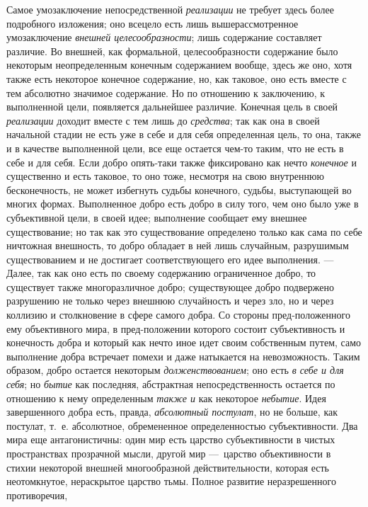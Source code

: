 \documentclass[twoside]{article}
\begin{document}
Самое умозаключение непосредственной
{\em реализации} не
требует здесь более подробного изложения; оно всецело есть лишь
вышерассмотренное умозаключение
{\em внешней целесообразности};
лишь содержание составляет различие. Во внешней, как
формальной, целесообразности содержание было некоторым неопределенным
конечным содержанием вообще, здесь же оно, хотя также есть некоторое
конечное содержание, но, как таковое, оно есть вместе с тем абсолютно
значимое содержание. Но по отношению к заключению, к выполненной цели,
появляется дальнейшее различие. Конечная цель в своей
{\em реализации} доходит
вместе с тем лишь до {\em средства};
так как она в своей начальной стадии не есть уже в себе и для
себя определенная цель, то она, также и в качестве выполненной цели, все
еще остается чем-то таким, что не есть в себе и для себя. Если добро
опять-таки также фиксировано как нечто
{\em конечное} и
существенно и есть таковое, то оно тоже, несмотря на свою внутреннюю
бесконечность, не может избегнуть судьбы конечного, судьбы, выступающей во
многих формах. Выполненное добро есть добро в силу того, чем оно было уже в
субъективной цели, в своей идее; выполнение сообщает ему внешнее
существование; но так как это существование определено только как сама по
себе ничтожная внешность, то добро обладает в ней лишь случайным,
разрушимым существованием и не достигает соответствующего его идее
выполнения. — Далее, так как оно есть по своему содержанию
ограниченное добро, то существует также многоразличное добро; существующее
добро подвержено разрушению не только через внешнюю случайность и через
зло, но и через коллизию и столкновение в сфере самого добра. Со стороны
пред-положенного ему объективного мира, в пред-положении которого состоит
субъективность и конечность добра и который как нечто иное идет своим
собственным путем, само выполнение добра встречает помехи и даже натыкается
на невозможность. Таким образом, добро остается некоторым
{\em долженствованием};
оно есть {\em в себе и для
себя}; но {\em бытие}
как последняя, абстрактная непосредственность остается по
отношению к нему определенным {\em также
и} как некоторое
{\em небытие}. Идея
завершенного добра есть, правда,
{\em абсолютный постулат},
но не больше, как постулат, т.~е. абсолютное, обремененное
определенностью субъективности. Два мира еще антагонистичны: один мир есть
царство субъективности в чистых пространствах прозрачной мысли, другой мир
—~царство объективности в стихии некоторой внешней
многообразной действительности, которая есть неотомкнутое, нераскрытое
царство тьмы. Полное развитие неразрешенного противоречия,
\end{document}
